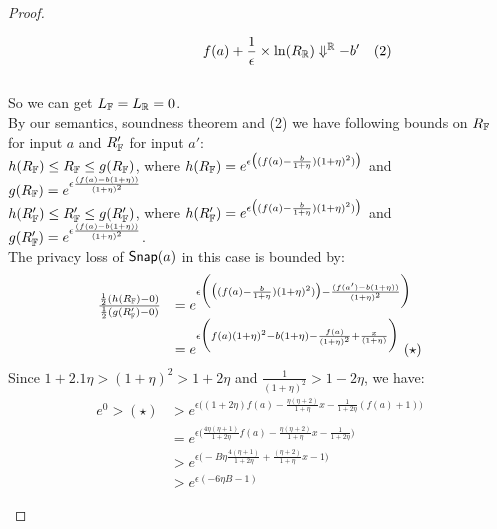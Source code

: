 \documentclass[a4paper,11pt]{article}
\begin{document}
\begin{proof}
\begin{itemize}
$$		~~~~~~~~~~~~~~~~
		f(a) + \frac{1}{\epsilon} \times \ln(R_{\mathbb{R}}) \Downarrow^{\mathbb{R}} -b' ~~~ (2)
		$$
		\\
		So we can get $L_{\mathbb{F}} = L_{\mathbb{R}} = 0$.
		\\
		By our semantics, soundness theorem and (2) we have following bounds on $R_{\mathbb{F}}$ for input $a$ and $R_{\mathbb{F}}'$ for input $a'$:
		\\
		$h(R_{\mathbb{F}}) \leq R_{\mathbb{F}} \leq g(R_{\mathbb{F}})$, where
		$h(R_{\mathbb{F}}) = e^{\epsilon 
		\big( (f(a) -  \frac{b}{1 + \eta}) (1 + \eta)^2) \big)}$
		and
		$g(R_{\mathbb{F}}) = e^{\epsilon 
		\frac{(f(a) - b(1 + \eta))}{(1 + \eta)^2}}$
		\\
		$h(R_{\mathbb{F}}') \leq R_{\mathbb{F}}' \leq g(R_{\mathbb{F}}')$, where
		$h(R_{\mathbb{F}}') = e^{\epsilon 
		\big( (f(a) -  \frac{b}{1 + \eta}) (1 + \eta)^2) \big)}$
		and
		$g(R_{\mathbb{F}}') = e^{\epsilon 
		\frac{(f(a) - b(1 + \eta))}{(1 + \eta)^2}}$.
		\\
		The privacy loss of $\mathsf{Snap}(a)$ in this case is bounded by:
		\[
		\begin{array}{ll}
		\frac
		{\frac{1}{2}(h(\fvalR) - 0)}
		{\frac{1}{2}(g(\fvalR') - 0)}
		& = e^{\epsilon
		\bigg(
		\big( (f(a) -  \frac{b}{1 + \eta}) (1 + \eta)^2) \big)
		-
		\frac{(f(a') - b(1 + \eta))}{(1 + \eta)^2}
		\bigg)}\\
		& = e^{\epsilon
		\bigg(
		f(a)(1 + \eta)^2 - b(1 + \eta) 
		- \frac{f(a)}{(1 + \eta)^2} + \frac{x}{(1 + \eta)}   
		\bigg)} ~ (\star)
		\end{array}
		\]
		Since $ 1 + 2.1\eta > (1 + \eta)^2 > 1 + 2\eta$ and $\frac{1}{(1 + \eta)^2} > 1 - 2 \eta$, we have:
		\[
		\begin{array}{ll}
		e^0 > (\star) & > e^{\epsilon \big(
		(1 + 2\eta) f(a) - \frac{\eta(\eta + 2)}{1 + \eta} x
		- \frac{1}{1 + 2\eta}(f(a) + 1)
		\big)}\\
		& = e^{\epsilon\big(
		\frac{4\eta(\eta + 1)}{1 + 2\eta} f(a) 
		- \frac{\eta(\eta + 2)}{1 + \eta} x
		- \frac{1}{1 + 2\eta}		
		\big)}\\
		& > e^{\epsilon\big( -B \eta
		\frac{4(\eta + 1)}{1 + 2\eta} + \frac{(\eta + 2)}{1 + \eta} x - 1	
		\big)}\\
%
		& > e^{\epsilon(-6 \eta B - 1)}
		\end{array}
		\]
	\end{itemize}



\end{proof}




\newpage


\end{document}
